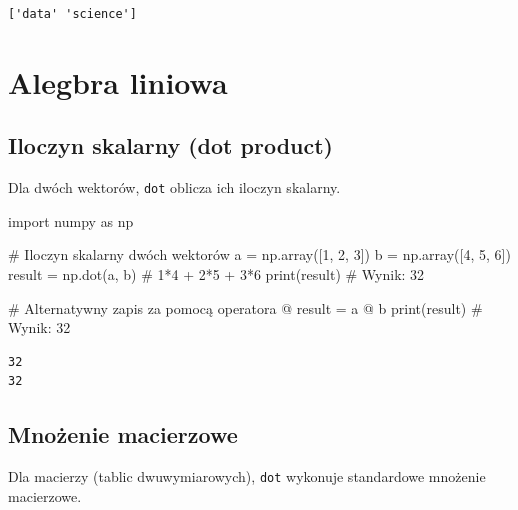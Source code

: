 \documentclass[
  polish,
  letterpaper,
  DIV=11,
  numbers=noendperiod]{scrreprt}
\newenvironment{Shaded}{\begin{snugshade}}{\end{snugshade}}
\newcommand{\BuiltInTok}[1]{\textcolor[rgb]{0.00,0.23,0.31}{#1}}
\newcommand{\CommentTok}[1]{\textcolor[rgb]{0.37,0.37,0.37}{#1}}
\newcommand{\DecValTok}[1]{\textcolor[rgb]{0.68,0.00,0.00}{#1}}
\newcommand{\ImportTok}[1]{\textcolor[rgb]{0.00,0.46,0.62}{#1}}
\newcommand{\NormalTok}[1]{\textcolor[rgb]{0.00,0.23,0.31}{#1}}
\newcommand{\OperatorTok}[1]{\textcolor[rgb]{0.37,0.37,0.37}{#1}}
\begin{document}
\begin{verbatim}
['data' 'science']
\end{verbatim}

\chapter{Alegbra liniowa}\label{alegbra-liniowa}

\section{Iloczyn skalarny (dot
product)}\label{iloczyn-skalarny-dot-product}

Dla dwóch wektorów, \texttt{dot} oblicza ich iloczyn skalarny.

\begin{Shaded}
\begin{Highlighting}[]
\ImportTok{import}\NormalTok{ numpy }\ImportTok{as}\NormalTok{ np}

\CommentTok{\# Iloczyn skalarny dwóch wektorów}
\NormalTok{a }\OperatorTok{=}\NormalTok{ np.array([}\DecValTok{1}\NormalTok{, }\DecValTok{2}\NormalTok{, }\DecValTok{3}\NormalTok{])}
\NormalTok{b }\OperatorTok{=}\NormalTok{ np.array([}\DecValTok{4}\NormalTok{, }\DecValTok{5}\NormalTok{, }\DecValTok{6}\NormalTok{])}
\NormalTok{result }\OperatorTok{=}\NormalTok{ np.dot(a, b)  }\CommentTok{\# 1*4 + 2*5 + 3*6}
\BuiltInTok{print}\NormalTok{(result)  }\CommentTok{\# Wynik: 32}

\CommentTok{\# Alternatywny zapis za pomocą operatora @}
\NormalTok{result }\OperatorTok{=}\NormalTok{ a }\OperatorTok{@}\NormalTok{ b}
\BuiltInTok{print}\NormalTok{(result)  }\CommentTok{\# Wynik: 32}
\end{Highlighting}
\end{Shaded}

\begin{verbatim}
32
32
\end{verbatim}

\section{Mnożenie macierzowe}\label{mnoux17cenie-macierzowe}

Dla macierzy (tablic dwuwymiarowych), \texttt{dot} wykonuje standardowe
mnożenie macierzowe.
\end{document}
